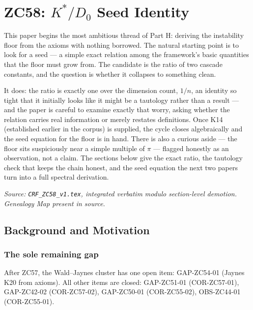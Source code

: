 \documentclass[12pt, a4paper]{article}
\begin{document}
\bigskip

\section{ZC58: $K^{*}/D_{0}$ Seed Identity}

This paper begins the most ambitious thread of Part H: deriving the instability
floor from the axioms with nothing borrowed. The natural starting point is to
look for a seed --- a simple exact relation among the framework's basic
quantities that the floor must grow from. The candidate is the ratio of two
cascade constants, and the question is whether it collapses to something clean.

It does: the ratio is exactly one over the dimension count, $1/n$, an identity
so tight that it initially looks like it might be a tautology rather than a
result --- and the paper is careful to examine exactly that worry, asking whether
the relation carries real information or merely restates definitions. Once K14
(established earlier in the corpus) is supplied, the cycle closes algebraically
and the seed equation for the floor is in hand. There is also a curious aside ---
the floor sits suspiciously near a simple multiple of $\pi$ --- flagged honestly
as an observation, not a claim. The sections below give the exact ratio, the
tautology check that keeps the chain honest, and the seed equation the next two
papers turn into a full spectral derivation.
\label{sec:zc58}

\noindent
\textit{Source: \texttt{CRF\_ZC58\_v1.tex}, integrated verbatim modulo
section-level demotion. Genealogy Map present in source.}

\medskip
\subsection{Background and Motivation}

\subsubsection{The sole remaining gap}

After ZC57, the Wald--Jaynes cluster has one open item:
GAP-ZC54-01 (Jaynes K20 from axioms).
All other items are closed:
GAP-ZC51-01 (COR-ZC57-01),
GAP-ZC42-02 (COR-ZC57-02),
GAP-ZC50-01 (COR-ZC55-02),
OBS-ZC44-01 (COR-ZC55-01).
\end{document}

